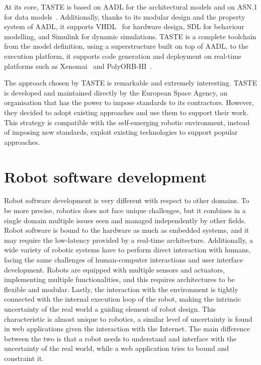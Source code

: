 At its core, TASTE is based on AADL for the architectural models and on ASN.1 for data models~\cite{perrotin2011taste}. Additionally, thanks to its modular design and the property system of AADL, it supports VHDL~\cite{navabi1997vhdl} for hardware design, SDL for behaviour modelling, and Simulink for dynamic simulations. TASTE is a complete toolchain from the model definition, using a superstructure built on top of AADL, to the execution platform, it supports code generation and deployment on real-time platforms such as Xenomai~\cite{gerum2004xenomai} and PolyORB-HI~\cite{vergnaud2004polyorb}.

The approach chosen by TASTE is remarkable and extremely interesting. TASTE is developed and maintained directly by the European Space Agency, an organisation that has the power to impose standards to its contractors. However, they decided to adopt existing approaches and use them to support their work. This strategy is compatible with the self-emerging robotic environment, instead of imposing new standards, exploit existing technologies to support popular approaches.


\section{Robot software development}
Robot software development is very different with respect to other domains. To be more precise, robotics does not face unique challenges, but it combines in a single domain multiple issues seen and managed independently by other fields. Robot software is bound to the hardware as much as embedded systems, and it may require the low-latency provided by a real-time architecture. Additionally, a wide variety of robotic systems have to perform direct interaction with humans, facing the same challenges of human-computer interactions and user interface development. Robots are equipped with multiple sensors and actuators, implementing multiple functionalities, and this requires architectures to be flexible and modular. Lastly, the interaction with the environment is tightly connected with the internal execution loop of the robot, making the intrinsic uncertainty of the real world a guiding element of robot design. This characteristic is almost unique to robotics, a similar level of uncertainty is found in web applications given the interaction with the Internet. The main difference between the two is that a robot needs to understand and interface with the uncertainty of the real world, while a web application tries to bound and constraint it.


